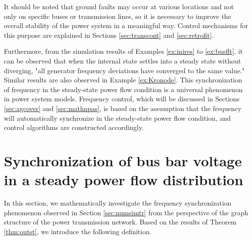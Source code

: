 \documentclass[graybox, envcountchap]{svmult}
\begin{document}
It should be noted that ground faults may occur at various locations and not
only on specific buses or transmission lines, so it is necessary to improve the
overall stability of the power system in a meaningful way. Control mechanisms
for this purpose are explained in Sections \ref{sec:transcont} and
\ref{sec:retrofit}.

Furthermore, from the simulation results of Examples \ref{ex:inires} to
\ref{ex:busflt}, it can be observed that when the internal state settles into a
steady state without diverging, "all generator frequency deviations have
converged to the same value." Similar results are also observed in Example
\ref{ex:Kronode}. This synchronization of frequency in the steady-state power
flow condition is a universal phenomenon in power system models. Frequency
control, which will be discussed in Sections \ref{sec:agcover} and
\ref{sec:mathnpas}, is based on the assumption that the frequency will
automatically synchronize in the steady-state power flow condition, and control
algorithms are constructed accordingly.

\section{Synchronization of bus bar voltage in a steady power flow distribution}\label{sec:phsync}

In this section, we mathematically investigate the frequency synchronization
phenomenon observed in Section \ref{sec:numsimtr} from the perspective of the
graph structure of the power transmission network. Based on the results of
Theorem \ref{thm:outst}, we introduce the following definition.
\end{document}
